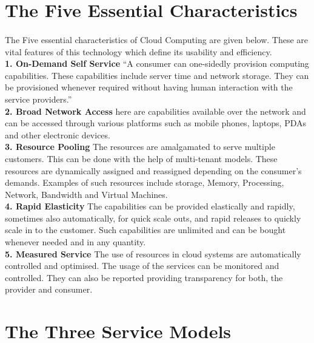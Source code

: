\section{The Five Essential Characteristics}
\paragraph{\hspace{24pt}}
The Five essential characteristics of Cloud Computing are given below. These are vital features of this technology which define its usability and efficiency.\\
\textbf{1. On-Demand Self Service} {“A consumer can one-sidedly provision computing capabilities. These capabilities include server time and network storage. They can be provisioned whenever required without having human interaction with the service providers.”}\\
\textbf{2. Broad Network Access} {here are capabilities available over the network and can be accessed through various platforms such as mobile phones, laptops, PDAs and other electronic devices.}\\
\textbf{3. Resource Pooling} {The resources are amalgamated to serve multiple customers. This can be done with the help of multi-tenant models. These resources are dynamically assigned and reassigned depending on the consumer’s demands. Examples of such resources include storage, Memory, Processing, Network, Bandwidth and Virtual Machines.}\\
\textbf{4. Rapid Elasticity} {The capabilities can be provided elastically and rapidly, sometimes also automatically, for quick scale outs, and rapid releases to quickly scale in to the customer. Such capabilities are unlimited and can be bought whenever needed and in any quantity.}\\
\textbf{5. Measured Service} {The use of resources in cloud systems are automatically controlled and optimised. The usage of the services can be monitored and controlled. They can also be reported providing transparency for both, the provider and consumer.}

\section{The Three Service Models}
